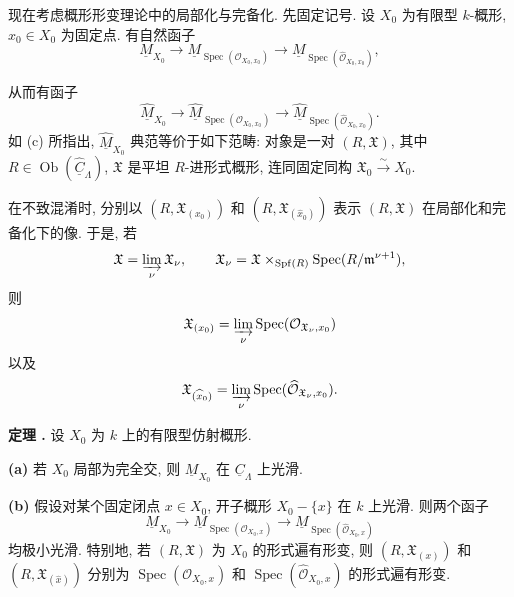 现在考虑概形形变理论中的局部化与完备化. 先固定记号. 设 $X_0$ 为有限型 $k$-概形, $x_0\in X_0$ 为固定点. 有自然函子
\[
\underline M_{X_0}
\longrightarrow
\underline M_{\operatorname{Spec}(\mathcal O_{X_0,x_0})}
\longrightarrow
\underline M_{\operatorname{Spec}(\widehat{\mathcal O}_{X_0,x_0})},
\]


从而有函子
\[
\widehat{\underline M}_{X_0}
\longrightarrow
\widehat{\underline M}_{\operatorname{Spec}(\mathcal O_{X_0,x_0})}
\longrightarrow
\widehat{\underline M}_{\operatorname{Spec}
 (\widehat{\mathcal O}_{X_0,x_0})}.
\]
如 (c) 所指出, $\widehat{\underline M}_{X_0}$ 典范等价于如下范畴: 对象是一对 $(R,\mathfrak X)$, 其中 $R\in\operatorname{Ob}(\widehat{\underline C}_\Lambda)$, $\mathfrak X$ 是平坦 $R$-进形式概形, 连同固定同构 $\mathfrak X_0\xrightarrow{\sim}X_0$.

在不致混淆时, 分别以 $(R,\mathfrak X_{(x_0)})$ 和 $(R,\mathfrak X_{(\widehat{x}_0)})$ 表示 $(R,\mathfrak X)$ 在局部化和完备化下的像. 于是, 若
\[
\mathfrak X=\varinjlim_\nu\mathfrak X_\nu,
\qquad
\mathfrak X_\nu
=\mathfrak X\times_{\operatorname{Spf}(R)}
 \operatorname{Spec}(R/\mathfrak m^{\nu+1}),
\]
则
\[
\mathfrak X_{(x_0)}
=\varinjlim_\nu
 \operatorname{Spec}(\mathcal O_{\mathfrak X_\nu,x_0})
\]
以及
\[
\mathfrak X_{(\widehat{x}_0)}
=\varinjlim_\nu
 \operatorname{Spec}(\widehat{\mathcal O}_{\mathfrak X_\nu,x_0}).
\]



\medskip
\noindent\textbf{定理 .}
设 $X_0$ 为 $k$ 上的有限型仿射概形.

\smallskip
\noindent\textbf{(a)}
若 $X_0$ 局部为完全交, 则 $\underline M_{X_0}$ 在 $\underline C_\Lambda$ 上光滑.

\smallskip
\noindent\textbf{(b)}
假设对某个固定闭点 $x\in X_0$, 开子概形 $X_0-\{x\}$ 在 $k$ 上光滑. 则两个函子
\[
\underline M_{X_0}
\longrightarrow
\underline M_{\operatorname{Spec}(\mathcal O_{X_0,x})}
\longrightarrow
\underline M_{\operatorname{Spec}(\widehat{\mathcal O}_{X_0,x})}
\]
均极小光滑. 特别地, 若 $(R,\mathfrak X)$ 为 $X_0$ 的形式遍有形变, 则 $(R,\mathfrak X_{(x)})$ 和 $(R,\mathfrak X_{(\widehat x)})$ 分别为 $\operatorname{Spec}(\mathcal O_{X_0,x})$ 和 $\operatorname{Spec}(\widehat{\mathcal O}_{X_0,x})$ 的形式遍有形变.

